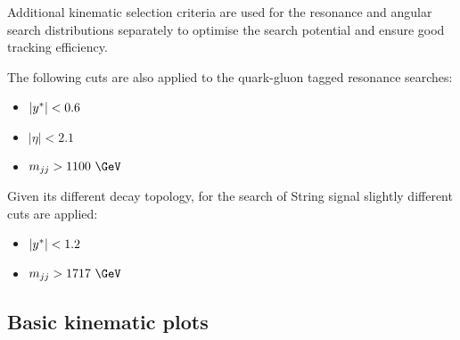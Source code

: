 Additional kinematic selection criteria are used for the resonance and
angular search distributions separately to optimise the search
potential and ensure good tracking efficiency.


The following cuts are also applied to the quark-gluon tagged resonance searches:
\begin{itemize}
\item $|y^\ast| < 0.6$
\item {} $| \eta | < 2.1$
\item $\mjj > 1100~\GeV$
\end{itemize}

Given its different decay topology, for the search of String signal slightly different cuts are applied:
\begin{itemize}
\item $|y^\ast| < 1.2$
\item $\mjj > 1717~\GeV$
\end{itemize}




\subsection{Basic kinematic plots}
\label{sec:kinematic_distributions}

